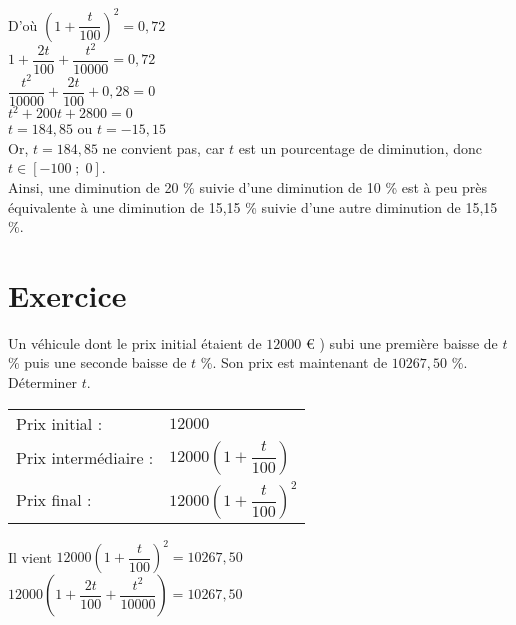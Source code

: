 D'où $\left(1 + \dfrac{t}{100}\right)^2 = 0,72$ \\

$ 1 + \dfrac{2t}{100} + \dfrac{t^2}{10 000} = 0,72$ \\

$\dfrac{t^2}{10 000} + \dfrac{2t}{100} + 0,28 = 0$ \\

$ t^2 + 200t + 2800 = 0$ \\

$t = 184,85$ ou $t = -15,15$ \\

Or, $t = 184,85$ ne convient pas, car $t$ est un pourcentage de diminution, donc $t \in \left[-100 \; ; \; 0 \right]$. \\

Ainsi, une diminution de 20 \% suivie d'une diminution de 10 \% est à peu près équivalente à une diminution de 15,15 \% suivie d'une autre diminution de 15,15 \%. \\

\newpage

\vspace*{-2cm}

\section{Exercice }

Un véhicule dont le prix initial étaient de $12 000$ € ) subi une première baisse de $t$ \% puis une seconde baisse de $t$ \%. Son prix est maintenant de $10 267,50$ \%. \\ Déterminer $t$. \\

\begin{tabular}{ll}
Prix initial : & $12 000$ \\
Prix intermédiaire : & $12 000 \left( 1 + \dfrac{t}{100}\right)$ \\
Prix final : & $12 000 \left( 1 + \dfrac{t}{100}\right)^2$ \\
\end{tabular}

\vspace*{.3cm}

Il vient $ 12 000 \left(1 + \dfrac{t}{100}\right)^2 = 10 267,50$ \\ 

$12 000 \left(1 + \dfrac{2t}{100} + \dfrac{t^2}{10 000}\right) = 10 267,50$ \\

